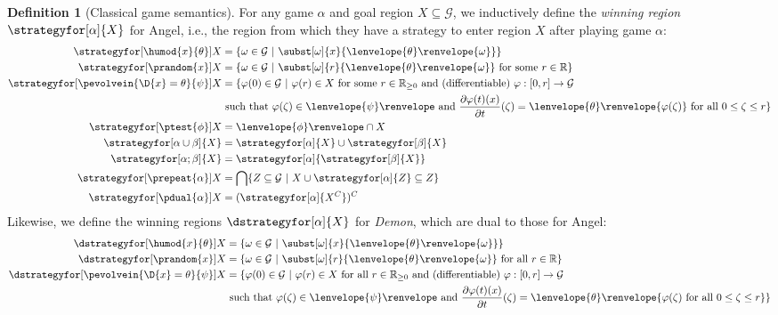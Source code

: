 \documentclass[12pt]{cmuthesis}
\theoremstyle{definition}
\newtheorem{definition}{Definition}
\theoremstyle{remark}
\newcommand{\ivr}{\psi}
\newcommand{\allstate}{\mathcal{G}}
\newcommand{\om}{\omega}
\newcommand{\tint}[2]{\lenvelope{#1}\renvelope{#2}}
\newcommand{\fint}[1]{\lenvelope{#1}\renvelope}
\begin{document}
\begin{definition}[Classical game semantics]\label{def:dgl-sem-game}
For any game $\alpha$ and goal region $X \subseteq \allstate$, we inductively define the \emph{winning region} $\strategyfor[\alpha]{X}$ for Angel, i.e., the region from which they have a strategy to enter region $X$ after playing game $\alpha$:
\begin{align*}
\strategyfor[\humod{x}{\theta}]{X} &= \{ \om \in \allstate~|~\subst[\om]{x}{\tint{\theta}{\om}}\} \\
\strategyfor[\prandom{x}]{X}       &= \{ \om \in \allstate~|~\subst[\om]{r}{\tint{\theta}{\om}}\text{ for some }r \in \mathbb{R}\} \\
\strategyfor[\pevolvein{\D{x}=\theta}{\ivr}]{X} &= \{\varphi(0) \in \allstate~|~\varphi(r) \in X\text{ for some }r \in \mathbb{R}_{\geq0}\text{ and (differentiable) }\varphi:[0,r]\to \allstate\\
&\text{ such that }\varphi(\zeta) \in \fint{\ivr}\text{ and } \frac{\partial \varphi(t)(x)}{\partial t}(\zeta) = \tint{\theta}{\varphi(\zeta)}\text{ for all }0 \leq \zeta \leq r \}\\
\strategyfor[\ptest{\phi}]{X}      &= \fint{\phi} \cap X \\
\strategyfor[\alpha \cup \beta]{X} &= \strategyfor[\alpha]{X} \cup \strategyfor[\beta]{X}\\
\strategyfor[\alpha;\beta]{X}      &= \strategyfor[\alpha]{\strategyfor[\beta]{X}}\\
\strategyfor[\prepeat{\alpha}]{X}  &= \bigcap\{Z \subseteq \allstate~|~ X \cup \strategyfor[\alpha]{Z} \subseteq Z\}\\
\strategyfor[\pdual{\alpha}]{X}    &= (\strategyfor[\alpha]{X^C})^C
\end{align*}
Likewise, we define the winning regions $\dstrategyfor[\alpha]{X}$ for \emph{Demon}, which are dual to those for Angel:
\begin{align*}
\dstrategyfor[\humod{x}{\theta}]{X} &= \{ \om \in \allstate~|~\subst[\om]{x}{\tint{\theta}{\om}}\}\\
\dstrategyfor[\prandom{x}]{X}       &= \{ \om \in \allstate~|~\subst[\om]{r}{\tint{\theta}{\om}}\text{ for all }r \in \mathbb{R}\} \\
\dstrategyfor[\pevolvein{\D{x}=\theta}{\ivr}]{X} &= \{\varphi(0) \in \allstate~|~\varphi(r) \in X\text{ for all }r \in \mathbb{R}_{\geq0}\text{ and (differentiable) }\varphi:[0,r]\to\allstate\\
&\text{ such that }\varphi(\zeta) \in \fint{\ivr}\text{ and }\frac{\partial\varphi(t)(x)}{\partial t}(\zeta) = \tint{\theta}{\varphi(\zeta)\text{ for all }0 \leq \zeta \leq r}\}\\

\end{align*}
\end{definition}
\end{document}

